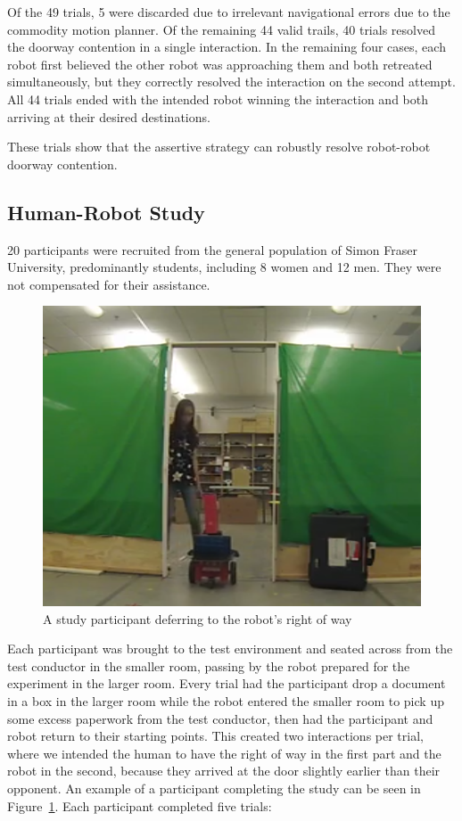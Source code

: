 \documentclass[letterpaper, 10 pt, conference]{ieeeconf}  %
\begin{document}
Of the 49 trials, 5 were discarded due to irrelevant navigational errors due to the commodity motion planner. Of the remaining 44 valid trails, 40 trials resolved the doorway contention in a single interaction. In the remaining four cases, each robot first believed the other robot was approaching them and both retreated simultaneously, but they correctly resolved the interaction on the second attempt. All 44 trials ended with the intended robot winning the interaction and both arriving at their desired destinations.

These trials show that the assertive strategy can robustly resolve robot-robot doorway contention. 

\subsection{Human-Robot Study}
20 participants were recruited from the general population of Simon Fraser University, predominantly students, including 8 women and 12 men. They were not compensated for their assistance.

     \begin{figure}
      \centering
      \includegraphics[width=\columnwidth]{test_example.png}
      \caption{A study participant deferring to the robot's right of way}
      \label{fig:Example}
   \end{figure}

Each participant was brought to the test environment and seated across from the test conductor in the smaller room, passing by the robot prepared for the experiment in the larger room. Every trial had the participant drop a document in a box in the larger room while the robot entered the smaller room to pick up some excess paperwork from the test conductor, then had the participant and robot return to their starting points. This created two interactions per trial, where we intended the human to have the right of way in the first part and the robot in the second, because they arrived at the door slightly earlier than their opponent. An example of a participant completing the study can be seen in Figure~\ref{fig:Example}. Each participant completed five trials:
\end{document}
